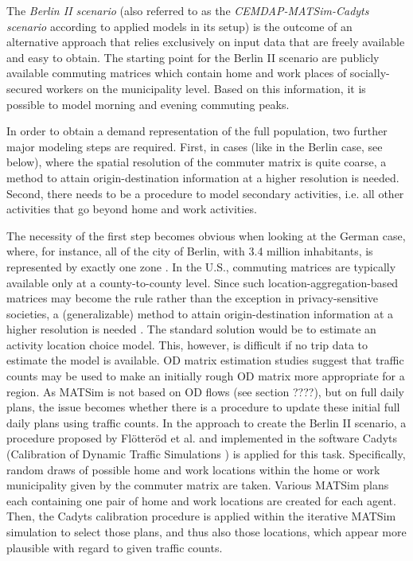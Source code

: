 The \textit{Berlin II scenario} (also referred to as the \textit{CEMDAP-MATSim-Cadyts scenario} according to applied models in its setup) is the outcome of an alternative approach that relies exclusively on input data that are freely available and easy to obtain. The starting point for the Berlin II scenario are publicly available commuting matrices which contain home and work places of socially-secured workers on the municipality level. Based on this information, it is possible to model morning and evening commuting peaks.

In order to obtain a demand representation of the full population, two further major modeling steps are required. First, in cases (like in the Berlin case, see below), where the spatial resolution of the commuter matrix is quite coarse, a method to attain origin-destination information at a higher resolution is needed. Second, there needs to be a procedure to model secondary activities, i.e. all other activities that go beyond home and work activities.

The necessity of the first step becomes obvious when looking at the German case, where, for instance, all of the city of Berlin, with 3.4 million inhabitants, is represented by exactly one zone \citep{BA2010Pendlerstatistik}. In the U.S., commuting matrices are typically available only at a county-to-county level. Since such location-aggregation-based matrices may become the rule rather than the exception in privacy-sensitive societies, a (generalizable) method to attain origin-destination information at a higher resolution is needed \citep{ ZiemkeNagelBhat2015IntegratingCemdapMatsimTransferabilityTRB}. The standard solution would be to estimate an activity location choice model. This, however, is difficult if no trip data to estimate the model is available. OD matrix estimation studies \citep{ZuylenWillumsenMatrix-from-cnts} suggest that traffic counts may be used to make an initially rough OD matrix more appropriate for a region. As MATSim is not based on OD flows (see section ????), but on full daily plans, the issue becomes whether there is a procedure to update these initial full daily plans using traffic counts. In the approach to create the Berlin II scenario, a procedure proposed by Flötteröd et al. \citep{FloetteroedBierlaireNagel2010Bayesian} and implemented in the software Cadyts (Calibration of Dynamic Traffic Simulations \citep{Floetteroed2010Manual110}) is applied for this task. Specifically, random draws of possible home and work locations within the home or work municipality given by the commuter matrix are taken. Various MATSim plans each containing one pair of home and work locations are created for each agent. Then, the Cadyts calibration procedure is applied within the iterative MATSim simulation to select those plans, and thus also those locations, which appear more plausible with regard to given traffic counts.

